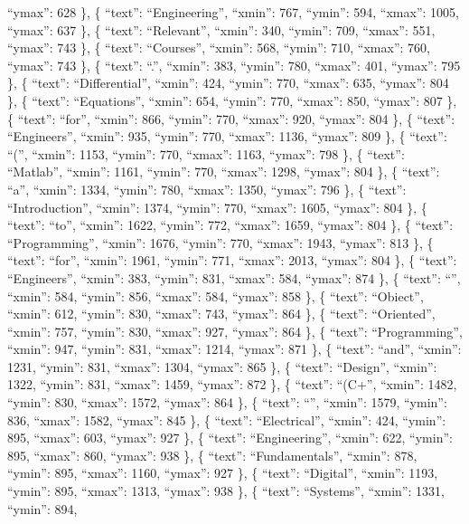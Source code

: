 \documentclass[
]{article}
\begin{document}
``ymax'': 628 \}, \{ ``text'': ``Engineering'', ``xmin'': 767, ``ymin'':
594, ``xmax'': 1005, ``ymax'': 637 \}, \{ ``text'': ``Relevant'',
``xmin'': 340, ``ymin'': 709, ``xmax'': 551, ``ymax'': 743 \}, \{
``text'': ``Courses'', ``xmin'': 568, ``ymin'': 710, ``xmax'': 760,
``ymax'': 743 \}, \{ ``text'': ``.'', ``xmin'': 383, ``ymin'': 780,
``xmax'': 401, ``ymax'': 795 \}, \{ ``text'': ``Differential'',
``xmin'': 424, ``ymin'': 770, ``xmax'': 635, ``ymax'': 804 \}, \{
``text'': ``Equations'', ``xmin'': 654, ``ymin'': 770, ``xmax'': 850,
``ymax'': 807 \}, \{ ``text'': ``for'', ``xmin'': 866, ``ymin'': 770,
``xmax'': 920, ``ymax'': 804 \}, \{ ``text'': ``Engineers'', ``xmin'':
935, ``ymin'': 770, ``xmax'': 1136, ``ymax'': 809 \}, \{ ``text'':
``('', ``xmin'': 1153, ``ymin'': 770, ``xmax'': 1163, ``ymax'': 798 \},
\{ ``text'': ``Matlab'', ``xmin'': 1161, ``ymin'': 770, ``xmax'': 1298,
``ymax'': 804 \}, \{ ``text'': ``a'', ``xmin'': 1334, ``ymin'': 780,
``xmax'': 1350, ``ymax'': 796 \}, \{ ``text'': ``Introduction'',
``xmin'': 1374, ``ymin'': 770, ``xmax'': 1605, ``ymax'': 804 \}, \{
``text'': ``to'', ``xmin'': 1622, ``ymin'': 772, ``xmax'': 1659,
``ymax'': 804 \}, \{ ``text'': ``Programming'', ``xmin'': 1676,
``ymin'': 770, ``xmax'': 1943, ``ymax'': 813 \}, \{ ``text'': ``for'',
``xmin'': 1961, ``ymin'': 771, ``xmax'': 2013, ``ymax'': 804 \}, \{
``text'': ``Engineers'', ``xmin'': 383, ``ymin'': 831, ``xmax'': 584,
``ymax'': 874 \}, \{ ``text'': ``\textbar{}'', ``xmin'': 584, ``ymin'':
856, ``xmax'': 584, ``ymax'': 858 \}, \{ ``text'': ``Obiect'', ``xmin'':
612, ``ymin'': 830, ``xmax'': 743, ``ymax'': 864 \}, \{ ``text'':
``Oriented'', ``xmin'': 757, ``ymin'': 830, ``xmax'': 927, ``ymax'': 864
\}, \{ ``text'': ``Programming'', ``xmin'': 947, ``ymin'': 831,
``xmax'': 1214, ``ymax'': 871 \}, \{ ``text'': ``and'', ``xmin'': 1231,
``ymin'': 831, ``xmax'': 1304, ``ymax'': 865 \}, \{ ``text'':
``Design'', ``xmin'': 1322, ``ymin'': 831, ``xmax'': 1459, ``ymax'': 872
\}, \{ ``text'': ``(C+'', ``xmin'': 1482, ``ymin'': 830, ``xmax'': 1572,
``ymax'': 864 \}, \{ ``text'': ``\textbar{}'', ``xmin'': 1579, ``ymin'':
836, ``xmax'': 1582, ``ymax'': 845 \}, \{ ``text'': ``Electrical'',
``xmin'': 424, ``ymin'': 895, ``xmax'': 603, ``ymax'': 927 \}, \{
``text'': ``Engineering'', ``xmin'': 622, ``ymin'': 895, ``xmax'': 860,
``ymax'': 938 \}, \{ ``text'': ``Fundamentals'', ``xmin'': 878,
``ymin'': 895, ``xmax'': 1160, ``ymax'': 927 \}, \{ ``text'':
``Digital'', ``xmin'': 1193, ``ymin'': 895, ``xmax'': 1313, ``ymax'':
938 \}, \{ ``text'': ``Systems'', ``xmin'': 1331, ``ymin'': 894,
\end{document}
